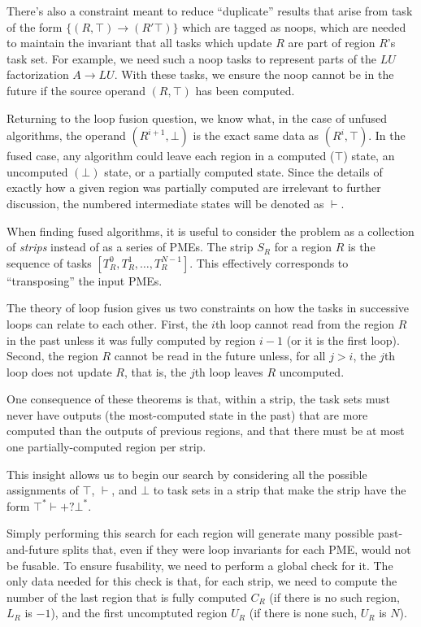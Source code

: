 \documentclass[12pt,letterpaper]{article}
\begin{document}
There's also a constraint meant to reduce ``duplicate'' results that arise from task of the form $\{(R, \top) \to (R' \top)\}$ which are tagged as noops, which are needed to maintain the invariant that all tasks which update $R$ are part of region $R$'s task set.
For example, we need such a noop tasks to represent parts of the $LU$ factorization $A \to LU$.
With these tasks, we ensure the noop cannot be in the future if the source operand $(R, \top)$ has been computed.

Returning to the loop fusion question, we know what, in the case of unfused algorithms, the operand $(R^{i + 1}, \bot)$ is the exact same data as $(R^{i}, \top)$.
In the fused case, any algorithm could leave each region in a computed ($\top$) state, an uncomputed $(\bot)$ state, or a partially computed state.
Since the details of exactly how a given region was partially computed are irrelevant to further discussion, the numbered intermediate states will be denoted as $\vdash$.

When finding fused algorithms, it is useful to consider the problem as a collection of \emph{strips} instead of as a series of PMEs.
The strip $S_R$ for a region $R$ is the sequence of tasks $[T^0_R, T^1_R, \ldots, T^{N - 1}_R]$.
This effectively corresponds to ``transposing'' the input PMEs.

The theory of loop fusion gives us two constraints on how the tasks in successive loops can relate to each other.
First, the $i$th loop cannot read from the region $R$ in the past unless it was fully computed by region $i - 1$ (or it is the first loop).
Second, the region $R$ cannot be read in the future unless, for all $j > i$, the $j$th loop does not update $R$, that is, the $j$th loop leaves $R$ uncomputed.

One consequence of these theorems is that, within a strip, the task sets must never have outputs (the most-computed state in the past) that are more computed than the outputs of previous regions, and that there must be at most one partially-computed region per strip.

This insight allows us to begin our search by considering all the possible assignments of $\top$, $\vdash$, and $\bot$ to task sets in a strip that make the strip have the form $\top^*\vdash+?\bot^*$.

Simply performing this search for each region will generate many possible past-and-future splits that, even if they were loop invariants for each PME, would not be fusable.
To ensure fusability, we need to perform a global check for it.
The only data needed for this check is that, for each strip, we need to compute the number of the last region that is fully computed $C_R$ (if there is no such region, $L_R$ is $-1$), and the first uncomptuted region $U_R$ (if there is none such, $U_R$ is $N$).
\end{document}
